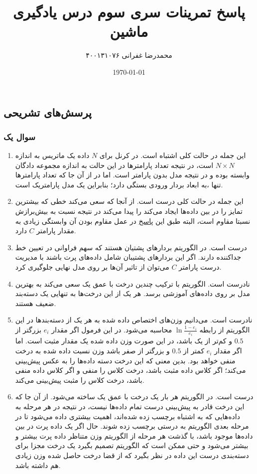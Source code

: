 \documentclass{article}
\title{\vspace{-4cm} \textbf{پاسخ تمرینات سری سوم درس یادگیری ماشین}}
\author{محمدرضا غفرانی  ۴۰۰۱۳۱۰۷۶}
\date{\today}
\begin{document}
\maketitle

\subsection*{پرسش‌های تشریحی}

\subsubsection*{سوال یک}

\begin{enumerate}[label=\alph*)]
    \item این جمله در حالت کلی اشتباه است. در  کرنل برای $N$ داده
    یک ماتریس به اندازه $N \times N$ است، در نتیجه تعداد پارامتر‌ها در این حالت به
    اندازه مجموعه دادگان وابسته بوده و در نتیجه مدل بدون پارامتر است. اما در  از آن جا که تعداد پارامتر‌ها تنها
    ،به ابعاد بردار ورودی بستگی دارد؛ بنابراین  یک مدل پارامتریک است.
    \item این جمله در حالت کلی درست است. از آنجا که  سعی می‌کند خطی که بیشترین تمایز را در بین
    داده‌ها ایجاد می‌کند را پیدا می‌کند در نتیجه نسبت به بیش‌برازش نسبتا مقاوم است، البته طبق این \href{https://stats.stackexchange.com/a/35311/343311}{پاسخ}
    در عمل مقاوم بودن آن وابستگی زیادی به مقدار پارامتر $C$ دارد.
    \item درست است. در الگوریتم  بردار‌های پشتیان هستند که سهم فراوانی در تعیین خط جداکننده دارند.
    اگر این بردار‌های پشتیبان شامل‌ داده‌های پرت باشند با مدیریت درست پارامتر $C$ می‌توان از تاثیر آن‌ها بر روی مدل نهایی جلوگیری کرد.
    \item نادرست است. الگوریتم  با ترکیب چندین درخت با عمق یک سعی می‌کند به بهترین
    مدل بر روی داده‌های آموزشی برسد. هر یک از این درخت‌ها به تنهایی یک دسته‌بند ضعیف هستند.
    \item نادرست است. می‌دانیم وزن‌های اختصاص داده شده به هر یک از دسته‌بند‌ها در این الگوریتم از رابطه
    $\ln\frac{1-e_i}{e_i}$ محاسبه می‌شود. در این فرمول اگر مقدار $e_i$ بزرگتر از $0.5$ و کم‌تر از یک
    باشد، در این صورت وزن داده شده یک مقدار مثبت است. اما اگر مقدار $e_i$ کمتر از $0.5$ و بزرگتر از
    صفر باشد وزن نسبت داده شده به درخت منفی خواهد بود. بدین معنی که این درخت دسته داده‌ها را به عکس پیش‌بینی می‌کند؛
    اگر کلاس داده مثبت باشد، درخت کلاس را منفی و اگر کلاس داده منفی باشد، درخت کلاس را مثبت پیش‌بینی می‌کند.
    \item درست است. در الگوریتم  هر بار یک درخت با عمق یک ساخته می‌شود. از آن جا که این درخت قادر به
    پیش‌بینی درست تمام داده‌ها نیست، در نتیجه در هر مرحله به داده‌هایی که به اشتباه برچسب زده شده‌اند، اهمیت بیشتری
    داده می‌شود تا در مرحله بعدی الگوریتم به درستی برچسب زده شوند. حال اگر یک داده پرت در بین داده‌ها موجود باشد،
    با گذشت هر مرحله از الگوریتم وزن متناظر داده پرت بیشتر و بیشتر می‌شود و حتی ممکن است که الگوریتم تصمیم بگیرد
    یک درخت مجزا برای دسته‌بندی درست این داده در نظر بگیرد که از قضا درخت حاصل شده وزن زیادی هم داشته باشد.
\end{enumerate}
\end{document}
